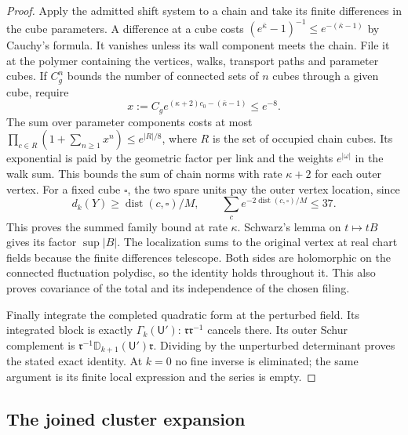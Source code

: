 \documentclass[11pt,letterpaper,reqno]{amsart}
\theoremstyle{definition}
\theoremstyle{remark}
\begin{document}
\begin{proof}
Apply the admitted shift system to a chain and take its finite
differences in the cube parameters.  A difference at a cube costs
$(e^{\bar\kappa}-1)^{-1}\le e^{-(\bar\kappa-1)}$ by Cauchy's
formula.  It vanishes unless its wall component meets the chain.
File it at the polymer containing the vertices, walks, transport
paths and parameter cubes.  If $C_g^n$ bounds the number of
connected sets of $n$ cubes through a given cube, require
\[
 x:=C_ge^{(\kappa+2)c_0-(\bar\kappa-1)}\le e^{-8}.
\]
The sum over parameter components costs at most
$\prod_{c\in R}(1+\sum_{n\ge1}x^n)\le e^{|R|/8}$, where
$R$ is the set of occupied chain cubes.  Its exponential is paid
by the geometric factor per link and the weights
$e^{|\omega|}$ in the walk sum.  This bounds the sum of chain
norms with rate $\kappa+2$ for each outer vertex.
For a fixed cube $\square$, the two spare units pay the outer
vertex location, since
\[
 d_k(Y)\ge\operatorname{dist}(c,\square)/M,\qquad
 \sum_c e^{-2\operatorname{dist}(c,\square)/M}\le37.
\]
This proves the summed family bound at rate $\kappa$.
Schwarz's lemma on $t\mapsto tB$ gives its factor $\sup|B|$.
The localization sums to the original vertex at real chart
fields because the finite differences telescope.  Both sides
are holomorphic on the connected fluctuation polydisc, so the
identity holds throughout it.  This also proves covariance of
the total and its independence of the chosen filing.

Finally integrate the completed quadratic form at the perturbed
field.  Its integrated block is exactly $\Gamma_k(\mathsf U')$:
$\mathfrak r\mathfrak r^{-1}$ cancels there.  Its outer Schur
complement is $\mathfrak r^{-1}\mathbb D_{k+1}(\mathsf U')
\mathfrak r$.  Dividing by the unperturbed determinant proves
the stated exact identity.  At $k=0$ no fine inverse is eliminated;
the same argument is its finite local expression and the series
is empty.
\end{proof}

\subsection{The joined cluster expansion}
\end{document}
